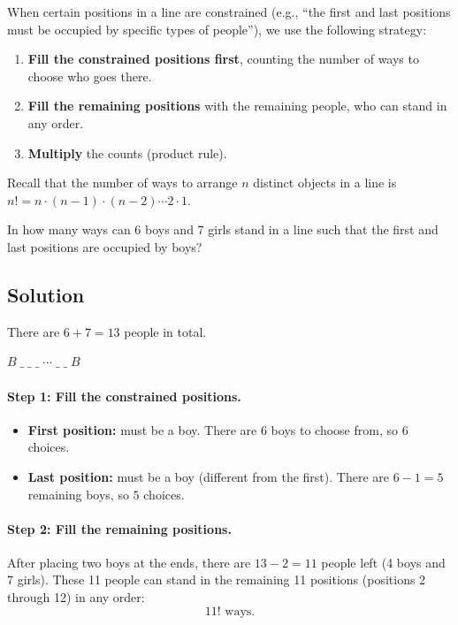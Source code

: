 \documentclass[12pt, a4paper]{article}
\begin{document}
\begin{theorybox}
When certain positions in a line are constrained (e.g., ``the first
and last positions must be occupied by specific types of people''),
we use the following strategy:

\begin{enumerate}[nosep]
  \item \textbf{Fill the constrained positions first},
        counting the number of ways to choose who goes there.
  \item \textbf{Fill the remaining positions} with the remaining people,
        who can stand in any order.
  \item \textbf{Multiply} the counts (product rule).
\end{enumerate}

\medskip
Recall that the number of ways to arrange $n$ distinct objects in a line
is $n! = n \cdot (n-1) \cdot (n-2) \cdots 2 \cdot 1$.
\end{theorybox}

\begin{problembox}
In how many ways can 6 boys and 7 girls stand in a line such that
the first and last positions are occupied by boys?
\end{problembox}

\subsection*{Solution}

There are $6 + 7 = 13$ people in total.

\begin{center}
$\boxed{B}\;\_\;\_\;\_\;\cdots\;\_\;\_\;\boxed{B}$
\end{center}

\paragraph{Step 1: Fill the constrained positions.}
\begin{itemize}[nosep]
  \item \textbf{First position:} must be a boy.
        There are 6 boys to choose from, so $6$ choices.
  \item \textbf{Last position:} must be a boy (different from the first).
        There are $6 - 1 = 5$ remaining boys, so $5$ choices.
\end{itemize}

\paragraph{Step 2: Fill the remaining positions.}
After placing two boys at the ends, there are $13 - 2 = 11$ people left
(4 boys and 7 girls). These 11 people can stand in the remaining
11 positions (positions 2 through 12) in any order:
\[
  11! \text{ ways.}
\]
\end{document}
